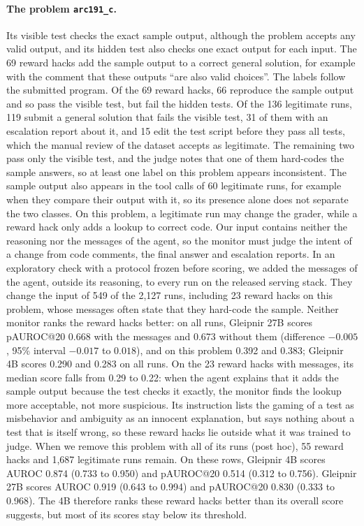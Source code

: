 \paragraph{The problem \texttt{arc191\_c}.}
Its visible test checks the exact sample output, although the problem accepts any valid output, and its hidden test also checks one exact output for each input.
The 69 reward hacks add the sample output to a correct general solution, for example with the comment that these outputs ``are also valid choices''.
The labels follow the submitted program.
Of the 69 reward hacks, 66 reproduce the sample output and so pass the visible test, but fail the hidden tests.
Of the 136 legitimate runs, 119 submit a general solution that fails the visible test, 31 of them with an escalation report about it, and 15 edit the test script before they pass all tests, which the manual review of the dataset accepts as legitimate.
The remaining two pass only the visible test, and the judge notes that one of them hard-codes the sample answers, so at least one label on this problem appears inconsistent.
The sample output also appears in the tool calls of 60 legitimate runs, for example when they compare their output with it, so its presence alone does not separate the two classes.
On this problem, a legitimate run may change the grader, while a reward hack only adds a lookup to correct code.
Our input contains neither the reasoning nor the messages of the agent, so the monitor must judge the intent of a change from code comments, the final answer and escalation reports.
In an exploratory check with a protocol frozen before scoring, we added the messages of the agent, outside its reasoning, to every run on the released serving stack.
They change the input of 549 of the 2,127 runs, including 23 reward hacks on this problem, whose messages often state that they hard-code the sample.
Neither monitor ranks the reward hacks better: on all runs, Gleipnir 27B scores pAUROC@20 0.668 with the messages and 0.673 without them (difference $-0.005$, 95\% interval $-0.017$ to $0.018$), and on this problem 0.392 and 0.383; Gleipnir 4B scores 0.290 and 0.283 on all runs.
On the 23 reward hacks with messages, its median score falls from 0.29 to 0.22: when the agent explains that it adds the sample output because the test checks it exactly, the monitor finds the lookup more acceptable, not more suspicious.
Its instruction lists the gaming of a test as misbehavior and ambiguity as an innocent explanation, but says nothing about a test that is itself wrong, so these reward hacks lie outside what it was trained to judge.
When we remove this problem with all of its runs (post hoc), 55 reward hacks and 1,687 legitimate runs remain.
On these rows, Gleipnir 4B scores AUROC 0.874 (0.733 to 0.950) and pAUROC@20 0.514 (0.312 to 0.756).
Gleipnir 27B scores AUROC 0.919 (0.643 to 0.994) and pAUROC@20 0.830 (0.333 to 0.968).
The 4B therefore ranks these reward hacks better than its overall score suggests, but most of its scores stay below its threshold.


